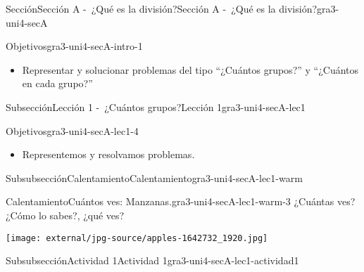 \documentclass[twoside,14pt,]{extarticle}
\begin{document}
%
%
\typeout{************************************************}
\typeout{************************************************}
%
\begin{sectionptx}{Sección}{Sección A -~¿Qué es la división?}{}{Sección A -~¿Qué es la división?}{}{}{gra3-uni4-secA}
\begin{introduction}{}%
\begin{objectives}{Objetivos}{gra3-uni4-secA-intro-1}
%
\begin{itemize}[label=\textbullet]
\item{}Representar y solucionar problemas del tipo “¿Cuántos grupos?” y “¿Cuántos en cada grupo?”%
\end{itemize}
\end{objectives}
\end{introduction}%
%
%
\typeout{************************************************}
\typeout{************************************************}
%
\begin{subsectionptx}{Subsección}{Lección 1 -~¿Cuántos grupos?}{}{Lección 1}{}{}{gra3-uni4-secA-lec1}
\begin{objectives}{Objetivos}{gra3-uni4-secA-lec1-4}
%
\begin{itemize}[label=\textbullet]
\item{}Representemos y resolvamos problemas.%
\end{itemize}
\end{objectives}
%
%
\typeout{************************************************}
\typeout{************************************************}
%
\begin{subsubsectionptx}{Subsubsección}{Calentamiento}{}{Calentamiento}{}{}{gra3-uni4-secA-lec1-warm}
\begin{exploration}{Calentamiento}{Cuántos ves: Manzanas.}{gra3-uni4-secA-lec1-warm-3}%
¿Cuántas ves? ¿Cómo lo sabes?, ¿qué ves?%
\begin{image}{0}{1}{0}{}%
\texttt{[image: external/jpg-source/apples-1642732\_1920.jpg]}
\end{image}%
\end{exploration}%
\end{subsubsectionptx}
%
%
\typeout{************************************************}
\typeout{************************************************}
%
\begin{subsubsectionptx}{Subsubsección}{Actividad 1}{}{Actividad 1}{}{}{gra3-uni4-secA-lec1-actividad1}

\end{subsubsectionptx}
\end{subsectionptx}
\end{sectionptx}
\end{document}
